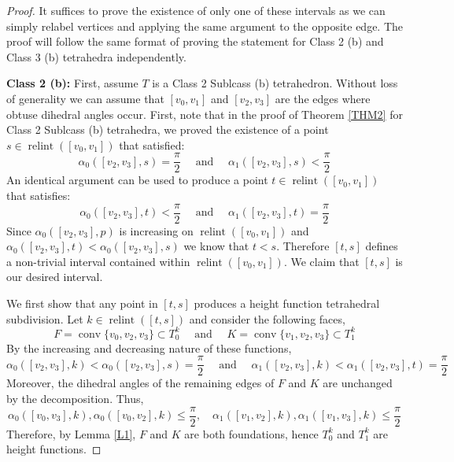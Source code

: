 \documentclass{mainresearch}
\begin{document}
\begin{proof}
	It suffices to prove the existence of only one of these intervals as we can simply relabel vertices and applying the same argument to the opposite edge. The proof will follow the same format of proving the statement for  Class 2 (b) and Class 3 (b) tetrahedra independently.
	
	\bigskip
	
	\noindent\textbf{Class 2 (b):} First, assume $T$ is a Class 2 Sublcass (b) tetrahedron. Without loss of generality we can assume that $[v_0,v_1]$ and $[v_2,v_3]$ are the edges where obtuse dihedral angles occur. First, note that in the proof of Theorem \ref{THM2} for Class 2 Sublcass (b) tetrahedra, we proved the existence of a point $s\in \operatorname{relint}([v_0,v_1])$ that satisfied:
	\[
	\alpha_0([v_2,v_3],s) = \frac{\pi}{2} \quad \text{ and } \quad \alpha_1([v_2,v_3],s) < \frac{\pi}{2}
	\]
	An identical argument can be used to produce a point $t\in \operatorname{relint}([v_0,v_1])$ that satisfies:
	\[
	\alpha_0([v_2,v_3],t) < \frac{\pi}{2} \quad \text{ and } \quad \alpha_1([v_2,v_3],t) = \frac{\pi}{2}
	\]
	Since $\alpha_0([v_2,v_3],p)$ is increasing on $\operatorname{relint}([v_0,v_1])$ and $\alpha_0([v_2,v_3],t)<\alpha_0([v_2,v_3],s)$ we know that $t<s$. Therefore $[t,s]$ defines a non-trivial interval contained within $\operatorname{relint}([v_0,v_1])$. We claim that $[t,s]$ is our desired interval.
	
	We first show that any point in $[t,s]$ produces a height function tetrahedral subdivision. Let $k\in \operatorname{relint}([t,s])$ and consider the following faces,
	\[
	F = \operatorname{conv}\{v_0,v_2,v_3\}\subset T_0^k \quad \text{ and } \quad K = \operatorname{conv}\{v_1,v_2,v_3\}\subset T_1^k
	\]
	By the increasing and decreasing nature of these functions,
	\[
	\alpha_0([v_2,v_3],k) < \alpha_0([v_2,v_3],s) = \frac{\pi}{2} \quad \text{ and } \quad \alpha_1([v_2,v_3],k) < \alpha_1([v_2,v_3],t) = \frac{\pi}{2}
	\]
	Moreover, the dihedral angles of the remaining edges of $F$ and $K$ are unchanged by the decomposition. Thus,
	\[
	\alpha_0([v_0,v_3],k), \alpha_0([v_0,v_2],k) \le \frac{\pi}{2},\quad  \alpha_1([v_1,v_2],k), \alpha_1([v_1,v_3],k) \le \frac{\pi}{2}
	\]
	Therefore, by Lemma \ref{L1}, $F$ and $K$ are both foundations, hence $T_0^k$ and $T_1^k$ are height functions.
	

\end{proof}
\end{document}
